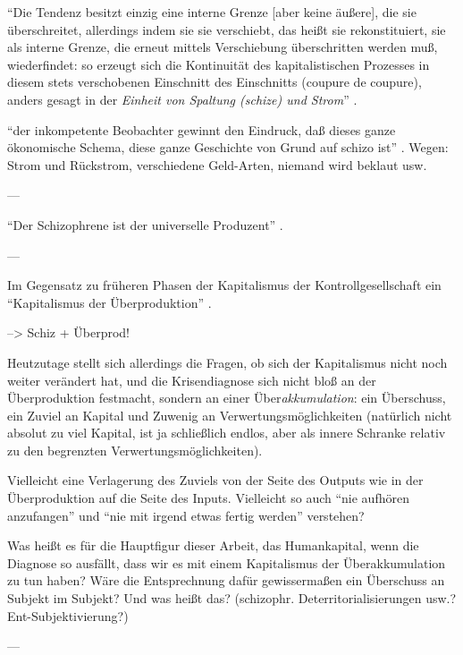 \documentclass[12pt,
               DIV13,
               paper=a4,
               twoside=false,
               onehalfspacing,
               bibliography=totoc,
               toc=graduated,
               draft,
               ]{scrartcl}
\newcommand{\pc}[2]{\parencite[#1]{#2}}
\newcommand{\worries}[1]{\ifdraft{\textcolor{blue}{\texttt{(#1)}}}{}}
\begin{document}
"`Die Tendenz besitzt einzig eine interne Grenze [aber keine äußere],
die sie überschreitet, allerdings indem sie sie verschiebt, das heißt
sie rekonstituiert, sie als interne Grenze, die erneut mittels
Verschiebung überschritten \worries{Selbst-Überschreitung} werden muß,
wiederfindet: so erzeugt sich die Kontinuität des kapitalistischen
Prozesses in diesem stets verschobenen Einschnitt des Einschnitts
(coupure de coupure), anders gesagt in der \emph{Einheit von Spaltung
(schize) und Strom}"' \pc{S. 296, meine Hervorh.}{ao}.


"`der inkompetente Beobachter gewinnt den Eindruck, daß dieses ganze
ökonomische Schema, diese ganze Geschichte von Grund auf schizo ist"'
\pc{306}{ao}. Wegen: Strom und Rück\-strom, verschiedene Geld-Arten,
niemand wird beklaut usw.

---

"`Der Schizophrene ist der universelle Produzent"' \pc{13}{ao}.

---

Im Gegensatz zu früheren Phasen der Kapitalismus der
Kontrollgesellschaft ein "`Kapitalismus der Überproduktion"'
\pc{259}{ps}.

--> Schiz + Überprod!

Heutzutage stellt sich allerdings die Fragen, ob sich der Kapitalismus
nicht noch weiter verändert hat, und die Krisendiagnose sich nicht
bloß an der Überproduktion festmacht, sondern an einer
Über\emph{akkumulation}: ein Überschuss, ein Zuviel an Kapital und
Zuwenig an Verwertungsmöglichkeiten (natürlich nicht absolut zu viel
Kapital, ist ja schließlich endlos, aber als innere Schranke relativ
zu den begrenzten Verwertungsmöglichkeiten).

Vielleicht eine Verlagerung des Zuviels von der Seite des Outputs wie
in der Überproduktion auf die Seite des Inputs. Vielleicht so auch
"`nie aufhören anzufangen"' und "`nie mit irgend etwas fertig werden"'
verstehen?

Was heißt es für die Hauptfigur dieser Arbeit, das Humankapital, wenn
die Diagnose so ausfällt, dass wir es mit einem Kapitalismus der
Überakkumulation zu tun haben? Wäre die Entsprechnung dafür
gewissermaßen ein Überschuss an Subjekt im Subjekt? Und was heißt das?
(schizophr. Deterritorialisierungen usw.? Ent-Subjektivierung?)

---
\end{document}
